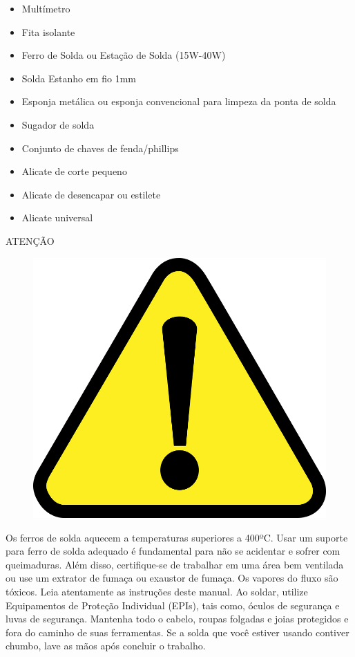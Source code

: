     		  
\begin{itemize}
    \item Multímetro
    \item Fita isolante
    \item Ferro de Solda ou Estação de Solda (15W-40W)
    \item Solda Estanho em fio 1mm
    \item Esponja metálica ou esponja convencional para limpeza da ponta de solda
    \item Sugador de solda
    \item Conjunto de chaves de fenda/phillips
    \item Alicate de corte pequeno
    \item Alicate de desencapar ou estilete
	\item Alicate universal
\end{itemize}


\begin{center}
ATENÇÃO
\begin{figure}[H]
 \centering
 \includegraphics[scale = 0.1]{Figuras/atenção.png}
\end{figure}
\end{center}

\par Os ferros de solda aquecem a temperaturas superiores a 400ºC. Usar um suporte para ferro de solda adequado é fundamental para não se acidentar e sofrer com queimaduras. Além disso, certifique-se de trabalhar em uma área bem ventilada ou use um extrator de fumaça ou exaustor de fumaça. Os vapores do fluxo são tóxicos. Leia atentamente as instruções deste manual. Ao soldar, utilize Equipamentos de Proteção Individual (EPIs), tais como, óculos de segurança e luvas de segurança. Mantenha todo o cabelo, roupas folgadas e joias protegidos e fora do caminho de suas ferramentas. Se a solda que você estiver usando contiver chumbo, lave as mãos após concluir o trabalho.


